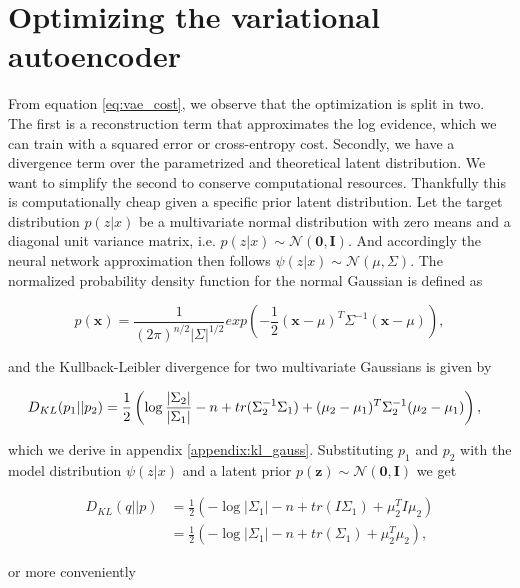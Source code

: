 \section{Optimizing the variational autoencoder}

From equation \ref{eq:vae_cost}, we observe that the optimization is split in two. The first is a reconstruction term that approximates the log evidence, which we can train with a squared error or cross-entropy cost. Secondly, we have a divergence term over the parametrized and theoretical latent distribution. We want to simplify the second to conserve computational resources. Thankfully this is computationally cheap given a specific prior latent distribution. Let the target distribution $p(z | x) $ be a multivariate normal distribution with zero means and a diagonal unit variance matrix, i.e. $p(z | x) \sim  \mathcal{N}(\boldsymbol{0}, \boldsymbol{I})$. And accordingly the neural network approximation then follows $\psi(z | x) \sim \mathcal{N}(\mu, \Sigma)$. The normalized probability density function for the normal Gaussian is defined as 

\begin{equation}
p(\boldsymbol{x}) = \frac{1}{(2\pi)^{n/2}|\Sigma|^{1/2}}exp(-\frac{1}{2}(\boldsymbol{x} - \mathbb{\mu})^T\Sigma^{-1}(\boldsymbol{x}-\mu)),
\end{equation}

\noindent and the Kullback-Leibler divergence for two multivariate Gaussians is given by 


\begin{equation}
\hspace*{-0.1in}
D_{KL}(p_1|| p_2 ) = \frac{1}{2} \left( \log \frac{|\Sigma_2|}{|\Sigma_1|} -n + tr(\Sigma^{-1}_2 \Sigma_1) + (\mu_2 - \mu_1)^T\Sigma_2^{-1}(\mu_2 - \mu_1) \right),
\end{equation}

\noindent which we derive in appendix \ref{appendix:kl_gauss}. Substituting $p_1$ and $p_2$ with the model distribution $\psi(z|x)$ and a latent prior $p(\boldsymbol{z}) \sim \mathcal{N}(\boldsymbol{0}, \boldsymbol{I})$ we get 

\begin{align*}
D_{KL}(q||p) &= \frac{1}{2} \left( - \log {|\Sigma_1|} -n + tr(I \Sigma_1) + \mu_2 ^TI\mu_2 \right) \\
&= \frac{1}{2} \left( - \log {|\Sigma_1|} -n + tr(\Sigma_1) + \mu_2 ^T\mu_2 \right),
\end{align*}

\noindent or more conveniently

